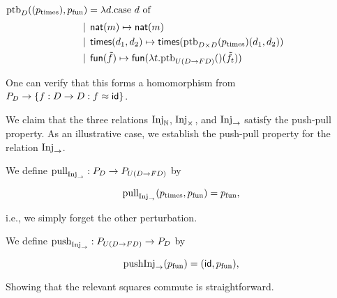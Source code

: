 %
%

$\text{ptb}_D((p_{\text{times}}), p_{\text{fun}}) = \lambda d.\text{case $d$ of}$
\begin{align*}
    &\mathrel{\bf \,\mid\,} \mathsf{nat}(m) \mapsto \mathsf{nat}(m) \\
    &\mathrel{\bf \,\mid\,} \mathsf{times}(d_1, d_2) \mapsto {\mathsf{times}(\text{ptb}_{D \times D}(p_\text{times})(d_1, d_2))} \\
    &\mathrel{\bf \,\mid\,} \mathsf{fun}(\tilde{f}) \mapsto {\mathsf{fun}(\lambda t. \text{ptb}_{U(D \to FD)}()(\tilde{f}_t))} \\
\end{align*}


One can verify that this forms a homomorphism from $P_D \to \{ f : D \to D : f \approx \mathsf{id} \}$.

We claim that the three relations $\text{Inj}_\mathbb{N}$, $\text{Inj}_\times$, and $\text{Inj}_\to$
satisfy the push-pull property.
As an illustrative case, we establish the push-pull property for the relation $\text{Inj}_\to$.

We define $\text{pull}_{\text{Inj}_\to} : P_D \to P_{U(D \to FD)}$ by

\[ \text{pull}_{\text{Inj}_\to}(p_{\text{times}}, p_{\text{fun}}) = p_{\text{fun}}, \]

i.e., we simply forget the other perturbation.

We define $\text{push}_{\text{Inj}_\to} : P_{U(D \to FD)} \to P_D$ by

\[ \text{push}{\text{Inj}_\to}(p_{\text{fun}}) = (\mathsf{id}, p_{\text{fun}}), \]

Showing that the relevant squares commute is straightforward.



